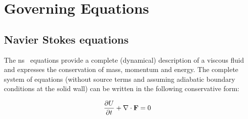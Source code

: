 
\section{Governing Equations}
\label{sec:govEq}
\subsection{Navier Stokes equations}

The \gls{ns}~\cite{Landau1993} equations provide a complete (dynamical) description of a viscous fluid and expresses the conservation of mass, momentum and energy. The complete system of equations (without source terms and assuming adiabatic boundary conditions at the solid wall) can be written in the following conservative form:

\begin{equation}\label{ns}
\frac{\partial U}{\partial t} +  \nabla \cdot {\bf F} = 0
\end{equation}

